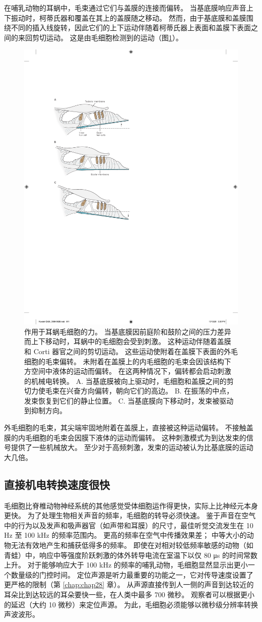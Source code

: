 在哺乳动物的耳蜗中，毛束通过它们与盖膜的连接而偏转。 
当基底膜响应声音上下振动时，柯蒂氏器和覆盖在其上的盖膜随之移动。 
然而，由于基底膜和盖膜围绕不同的插入线旋转，因此它们的上下运动伴随着柯蒂氏器上表面和盖膜下表面之间的来回剪切运动。 
这是由毛细胞检测到的运动（图\ref{fig:26_9}）。

\begin{figure}[htbp]
	\centering
	\includegraphics[width=0.5\linewidth]{chap26/fig_26_9}
	\caption{作用于耳蜗毛细胞的力。 
		当基底膜因前庭阶和鼓阶之间的压力差异而上下移动时，耳蜗中的毛细胞会受到刺激。 
		这种运动伴随着盖膜和 Corti 器官之间的剪切运动。 
		这些运动使附着在盖膜下表面的外毛细胞的毛束偏转。 
		未附着在盖膜上的内毛细胞的毛束会因该结构下方空间中液体的运动而偏转。 
		在这两种情况下，偏转都会启动刺激的机械电转换。 
		A. 当基底膜被向上驱动时，毛细胞和盖膜之间的剪切力使毛束在兴奋方向偏转，朝向它们的高边。 
		B. 在振荡的中点，发束恢复到它们的静止位置。 
		C. 当基底膜向下移动时，发束被驱动到抑制方向。}
	\label{fig:26_9}
\end{figure}


外毛细胞的毛束，其尖端牢固地附着在盖膜上，直接被这种运动偏转。 
不接触盖膜的内毛细胞的毛束会因膜下液体的运动而偏转。 
这种刺激模式为到达发束的信号提供了一些机械放大。 
至少对于高频刺激，发束的运动被认为比基底膜的运动大几倍。

\subsection{直接机电转换速度很快}
毛细胞比脊椎动物神经系统的其他感觉受体细胞运作得更快，实际上比神经元本身更快。 
为了处理生物相关声音的频率，毛细胞的转导必须快速。 
鉴于声音在空气中的行为以及发声和吸声器官（如声带和耳膜）的尺寸，最佳听觉交流发生在 10 Hz 至 100 kHz 的频率范围内。 
更高的频率在空气中传播效果差； 中等大小的动物无法有效地产生和捕获低得多的频率。 
即使在对相对较低频率敏感的动物（如青蛙）中，响应中等强度阶跃刺激的体外转导电流在室温下以仅 80 μs 的时间常数上升。 
对于能够响应大于 100 kHz 的频率的哺乳动物，毛细胞显然显示出更小一个数量级的门控时间。 
定位声源是听力最重要的功能之一，它对传导速度设置了更严格的限制（第 \ref{chap:chap28} 章）。 
从声源直接传到人一侧的声音到达较近的耳朵比到达较远的耳朵要快一些，在人类中最多 700 微秒。 观察者可以根据更小的延迟（大约 10 微秒）来定位声源。 
为此，毛细胞必须能够以微秒级分辨率转换声波波形。



